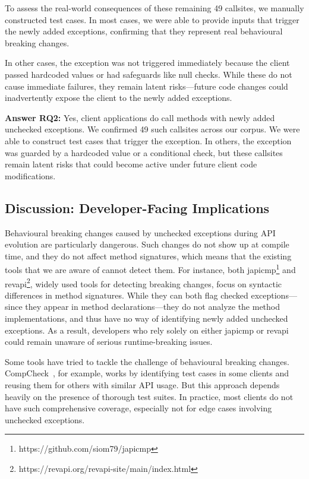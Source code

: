 To assess the real-world consequences of these remaining 49 callsites, we manually constructed test cases. In most cases, we were able to provide inputs that trigger the newly added exceptions, confirming that they represent real behavioural breaking changes.

In other cases, the exception was not triggered immediately because the client passed hardcoded values or had safeguards like null checks. While these do not cause immediate failures, they remain latent risks—future code changes could inadvertently expose the client to the newly added exceptions.

\vspace{1em}
\begin{tcolorbox}[colback=gray!10, colframe=black]
\textbf{Answer RQ2:} Yes, client applications do call methods with newly added unchecked exceptions. We confirmed 49 such callsites across our corpus. We were able to construct test cases that trigger the exception. In others, the exception was guarded by a hardcoded value or a conditional check, but these callsites remain latent risks that could become active under future client code modifications.
\end{tcolorbox}
\vspace{1em}

\subsection{Discussion: Developer-Facing Implications}

Behavioural breaking changes caused by unchecked exceptions during API evolution are particularly dangerous. Such changes do not show up at compile time, and they do not affect method signatures, which means that the existing tools that we are aware of cannot detect them. For instance, both japicmp\footnote{https://github.com/siom79/japicmp} and revapi\footnote{https://revapi.org/revapi-site/main/index.html}, widely used tools for detecting breaking changes, focus on syntactic differences in method signatures. While they can both flag checked exceptions—since they appear in method declarations—they do not analyze the method implementations, and thus have no way of identifying newly added unchecked exceptions. As a result, developers who rely solely on either japicmp or revapi could remain unaware of serious runtime-breaking issues.

Some tools have tried to tackle the challenge of behavioural breaking changes. CompCheck~\cite{CompCheck}, for example, works by identifying test cases in some clients and reusing them for others with similar API usage. But this approach depends heavily on the presence of thorough test suites. In practice, most clients do not have such comprehensive coverage, especially not for edge cases involving unchecked exceptions.

